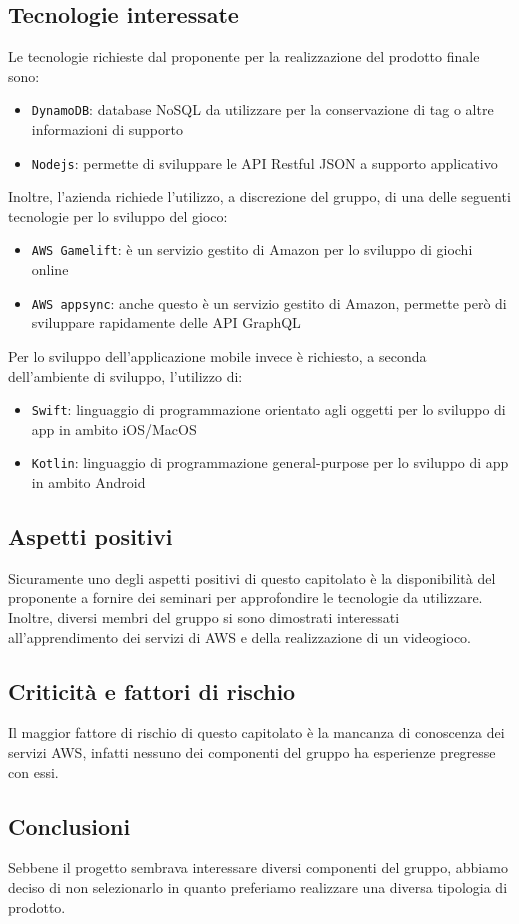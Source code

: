 \subsection{Tecnologie interessate}
Le tecnologie richieste dal proponente per la realizzazione del prodotto finale sono:
\begin{itemize}
	\item \verb|DynamoDB|: database NoSQL da utilizzare per la conservazione di tag o altre informazioni di supporto
	\item \verb|Nodejs|: permette di sviluppare le API Restful JSON a supporto applicativo
\end{itemize}
Inoltre, l'azienda richiede l'utilizzo, a discrezione del gruppo, di una delle seguenti tecnologie per lo sviluppo del gioco:
\begin{itemize}
	\item \verb|AWS Gamelift|: è un servizio gestito di Amazon per lo sviluppo di giochi online
	\item \verb|AWS appsync|: anche questo è un servizio gestito di Amazon, permette però di sviluppare rapidamente delle API GraphQL
\end{itemize}
Per lo sviluppo dell'applicazione mobile invece è richiesto, a seconda dell'ambiente di sviluppo, l'utilizzo di:
\begin{itemize}
	\item \verb|Swift|: linguaggio di programmazione orientato agli oggetti per lo sviluppo di app in ambito iOS/MacOS
	\item \verb|Kotlin|: linguaggio di programmazione general-purpose per lo sviluppo di app in ambito Android
\end{itemize}


\subsection{Aspetti positivi}
Sicuramente uno degli aspetti positivi di questo capitolato è la disponibilità del proponente a fornire dei seminari per approfondire le tecnologie da utilizzare.
Inoltre, diversi membri del gruppo si sono dimostrati interessati all'apprendimento dei servizi di AWS e della realizzazione di un videogioco.


\subsection{Criticità e fattori di rischio}
Il maggior fattore di rischio di questo capitolato è la mancanza di conoscenza dei servizi AWS, infatti nessuno dei componenti del gruppo ha esperienze pregresse con essi.


\subsection{Conclusioni}
Sebbene il progetto sembrava interessare diversi componenti del gruppo, abbiamo deciso di non selezionarlo in quanto preferiamo realizzare una diversa tipologia di prodotto.
\newpage